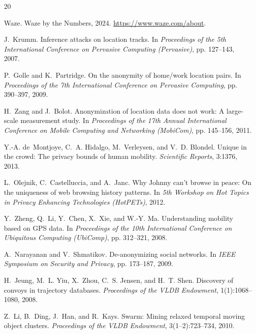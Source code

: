 \documentclass[11pt,a4paper]{article}
\begin{document}
\begin{thebibliography}{20}

Waze.
\newblock Waze by the Numbers, 2024.
\newblock \url{https://www.waze.com/about}.

J.~Krumm.
\newblock Inference attacks on location tracks.
\newblock In \emph{Proceedings of the 5th International Conference on Pervasive Computing (Pervasive)}, pp. 127--143, 2007.

P.~Golle and K.~Partridge.
\newblock On the anonymity of home/work location pairs.
\newblock In \emph{Proceedings of the 7th International Conference on Pervasive Computing}, pp. 390--397, 2009.

H.~Zang and J.~Bolot.
\newblock Anonymization of location data does not work: A large-scale measurement study.
\newblock In \emph{Proceedings of the 17th Annual International Conference on Mobile Computing and Networking (MobiCom)}, pp. 145--156, 2011.

Y.-A. de~Montjoye, C.~A. Hidalgo, M.~Verleysen, and V.~D. Blondel.
\newblock Unique in the crowd: The privacy bounds of human mobility.
\newblock \emph{Scientific Reports}, 3:1376, 2013.

L.~Olejnik, C.~Castelluccia, and A.~Janc.
\newblock Why Johnny can't browse in peace: On the uniqueness of web browsing history patterns.
\newblock In \emph{5th Workshop on Hot Topics in Privacy Enhancing Technologies (HotPETs)}, 2012.

Y.~Zheng, Q.~Li, Y.~Chen, X.~Xie, and W.-Y. Ma.
\newblock Understanding mobility based on GPS data.
\newblock In \emph{Proceedings of the 10th International Conference on Ubiquitous Computing (UbiComp)}, pp. 312--321, 2008.

A.~Narayanan and V.~Shmatikov.
\newblock De-anonymizing social networks.
\newblock In \emph{IEEE Symposium on Security and Privacy}, pp. 173--187, 2009.

H.~Jeung, M.~L. Yiu, X.~Zhou, C.~S. Jensen, and H.~T. Shen.
\newblock Discovery of convoys in trajectory databases.
\newblock \emph{Proceedings of the VLDB Endowment}, 1(1):1068--1080, 2008.

Z.~Li, B.~Ding, J.~Han, and R.~Kays.
\newblock Swarm: Mining relaxed temporal moving object clusters.
\newblock \emph{Proceedings of the VLDB Endowment}, 3(1--2):723--734, 2010.


\end{thebibliography}
\end{document}
